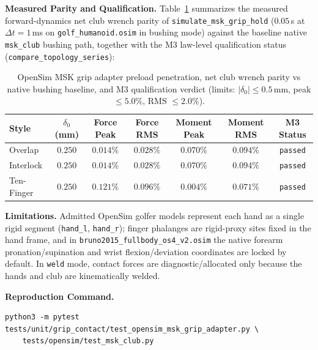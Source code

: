 \documentclass[11pt,a4paper]{article}
\begin{document}
\textbf{Measured Parity and Qualification.}
Table~\ref{tab:osim_msk_grip_parity} summarizes the measured forward-dynamics net club wrench parity of
\texttt{simulate\_msk\_grip\_hold} ($0.05$\,s at $\Delta t = 1$\,ms on \texttt{golf\_humanoid.osim} in
bushing mode) against the baseline native \texttt{msk\_club} bushing path, together with the M3
law-level qualification status (\texttt{compare\_topology\_series}):
\begin{table}[htbp]
\centering
\small
\begin{tabular}{lcccccc}
\toprule
\textbf{Style} & \textbf{$\delta_0$ (mm)} & \textbf{Force Peak} & \textbf{Force RMS} & \textbf{Moment Peak} & \textbf{Moment RMS} & \textbf{M3 Status} \\
\midrule
Overlap & $0.250$ & $0.014\%$ & $0.028\%$ & $0.070\%$ & $0.094\%$ & \texttt{passed} \\
Interlock & $0.250$ & $0.014\%$ & $0.028\%$ & $0.070\%$ & $0.094\%$ & \texttt{passed} \\
Ten-Finger & $0.250$ & $0.121\%$ & $0.096\%$ & $0.004\%$ & $0.071\%$ & \texttt{passed} \\
\bottomrule
\end{tabular}
\caption{OpenSim MSK grip adapter preload penetration, net club wrench parity vs native bushing baseline, and M3 qualification verdict (limits: $|\delta_0| \le 0.5$\,mm, peak $\le 5.0\%$, RMS $\le 2.0\%$).}
\label{tab:osim_msk_grip_parity}
\end{table}

\textbf{Limitations.}
Admitted OpenSim golfer models represent each hand as a single rigid segment (\texttt{hand\_l}, \texttt{hand\_r});
finger phalanges are rigid-proxy sites fixed in the hand frame, and in \texttt{bruno2015\_fullbody\_os4\_v2.osim}
the native forearm pronation/supination and wrist flexion/deviation coordinates are locked by default.
In \texttt{weld} mode, contact forces are diagnostic/allocated only because the hands and club are kinematically welded.

\textbf{Reproduction Command.}
\begin{verbatim}
python3 -m pytest tests/unit/grip_contact/test_opensim_msk_grip_adapter.py \
    tests/opensim/test_msk_club.py
\end{verbatim}
\end{document}
